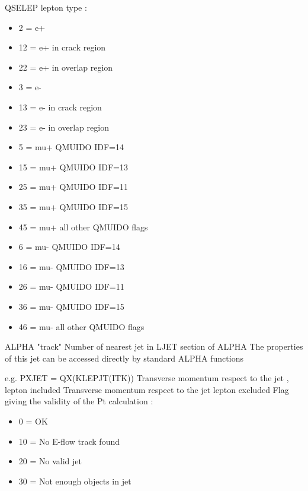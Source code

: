 \begin{indentlist}{ 3.50cm}{ 3.75cm}
    QSELEP lepton  type :
\par
\begin{itemize}
 
\item                 2 = e+
\item                12 = e+ in crack region
\item                22 = e+ in overlap region
\item                 3 = e-
\item                13 = e- in crack region
\item                23 = e- in overlap region
\item                 5 = mu+ QMUIDO IDF=14
\item                15 = mu+ QMUIDO IDF=13
\item                25 = mu+ QMUIDO IDF=11
\item                35 = mu+ QMUIDO IDF=15
\item                45 = mu+ all other QMUIDO flags
\item                 6 = mu- QMUIDO IDF=14
\item                16 = mu- QMUIDO IDF=13
\item                26 = mu- QMUIDO IDF=11
\item                36 = mu- QMUIDO IDF=15
\item                46 = mu- all other QMUIDO flags
\end{itemize}
    ALPHA "track" Number of nearest jet
                          in LJET section of ALPHA
                          The properties of this jet can be accessed directly
                          by standard ALPHA functions
 
                          e.g. PXJET = QX(KLEPJT(ITK))
  Transverse momentum respect to the jet , lepton included
  Transverse momentum respect to the jet lepton excluded
  Flag giving the validity of the Pt calculation :
\par
\begin{itemize}
 
\item                0 = OK
\item               10 = No E-flow track found
\item               20 = No valid jet
\item               30 = Not enough objects in jet
\end{itemize}
\end{indentlist}
 
